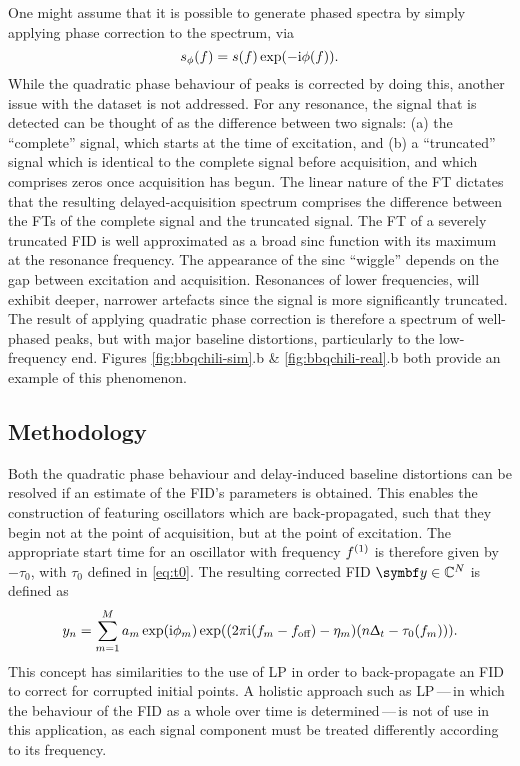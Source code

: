 One might assume that it is possible to generate phased spectra by simply
applying phase correction to the spectrum, via
\begin{equation}
    s_{\phi}(f) = s(f) \exp(-\mathrm{i} \phi(f)).
        \label{eq:spec-phase-chili}
\end{equation}
While the quadratic phase behaviour of peaks is corrected by doing this,
another issue with the dataset is not addressed.
For any resonance, the signal that is detected can be thought of as
the difference between two signals: (a) the ``complete'' signal, which starts
at the time of excitation, and (b) a ``truncated'' signal which is identical to
the complete signal before acquisition, and which comprises zeros once
acquisition has begun. The linear nature of the \ac{FT} dictates that the
resulting delayed-acquisition spectrum comprises the difference between the
\acp{FT} of the complete signal and the truncated signal.  The \ac{FT} of a
severely
truncated \ac{FID} is well approximated as a broad sinc function with its maximum
at the resonance frequency. The appearance of the sinc ``wiggle'' depends on
the gap between excitation and acquisition. Resonances of lower
frequencies, will exhibit deeper, narrower artefacts since the signal is more
significantly truncated. The result of applying quadratic phase correction is
therefore a spectrum of well-phased peaks, but with major baseline distortions,
particularly to the low-frequency end. Figures \ref{fig:bbqchili-sim}.b \&
\ref{fig:bbqchili-real}.b both provide an example of this phenomenon.

\subsection{Methodology}
Both the quadratic phase behaviour and delay-induced baseline distortions can
be resolved if an estimate of the \ac{FID}'s parameters is obtained. This enables
the construction of  featuring oscillators which are back-propagated,
such that they begin not at the point of acquisition, but at the point of
excitation. The appropriate start time for an oscillator with frequency $f^{(1)}$
is therefore given by $-\tau_0$, with $\tau_0$ defined in \eqref{eq:t0}. The
resulting corrected \ac{FID} $\by \in \mathbb{C}^N$ is defined as
\begin{equation}
    y_n = \sum_{m=1}^{M} a_m \exp(\mathrm{i} \phi_m) \exp((2 \pi \mathrm{i} (f_m - f_{\text{off}}) - \eta_m) (n \Updelta_t - \tau_0(f_m))).
    \label{eq:backprop}
\end{equation}
This concept has similarities to the use of \ac{LP} in order to back-propagate
an \ac{FID} to correct for corrupted initial points. A holistic approach such
as \ac{LP}\,---\,in which the behaviour of the \ac{FID} as a whole over time is
determined\,---\,is not of use in this application, as each signal component
must be treated differently according to its frequency.

